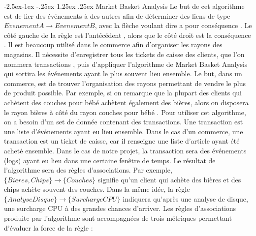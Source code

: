 \documentclass[paper=a4, fontsize=11pt]{scrartcl}
\makeatletter
\renewcommand\paragraph{\@startsection{paragraph}{4}{\z@}%
            {-2.5ex\@plus -1ex \@minus -.25ex}%
            {1.25ex \@plus .25ex}%
            {\normalfont\normalsize\bfseries}}
\makeatother
\begin{document}
\paragraph{Market Basket Analysis} \label{paragraph-MBA}
Le but de cet algorithme est de lier des événements à des autres afin de déterminer des liens de type $EvenementA \rightarrow EvenementB$, avec la flèche voulant dire \og a pour conséquence \fg. Le côté gauche de la règle est \og l'antécédent \fg, alors que le côté droit est la \og conséquence \fg. Il est beaucoup utilisé dans le commerce afin d'organiser les rayons des magasins. Il nécessite d'enregistrer tous les tickets de caisse des clients, que l'on nommera \og transactions \fg, puis d'appliquer l'algorithme de Market Basket Analysis qui sortira les événements ayant le plus souvent lieu ensemble. Le but, dans un commerce, est de trouver l'organisation des rayons permettant de vendre le plus de produit possible. Par exemple, si on remarque que la plupart des clients qui achètent des couches pour bébé achètent également des bières, alors on disposera le rayon \og bières \fg à côté du rayon \og couches pour bébé \fg. \newline
Pour utiliser cet algorithme, on a besoin d'un set de donnée contenant des transactions. Une transaction est une liste d'événements ayant eu lieu ensemble. Dans le cas d'un commerce, une transaction est un ticket de caisse, car il renseigne une liste d'article ayant été acheté ensemble. Dans le cas de notre projet, la transaction sera des événements (logs) ayant eu lieu dans une certaine fenêtre de temps. Le résultat de l'algorithme sera des règles d'associations. Par exemple, $\{Bieres, Chips\} \rightarrow \{Couches\}$ signifie qu'un client qui achète des bières et des chips achète souvent des couches. Dans la même idée, la règle $\{AnalyseDisque\} \rightarrow \{SurchargeCPU\}$ indiquera qu'après une analyse de disque, une surcharge CPU à des grandes chances d'arriver. \newline
Les règles d'associations produite par l'algorithme sont accompagnées de trois métriques permettant d'évaluer la force de la règle : \cite{noauthor_market_2017}
\end{document}
